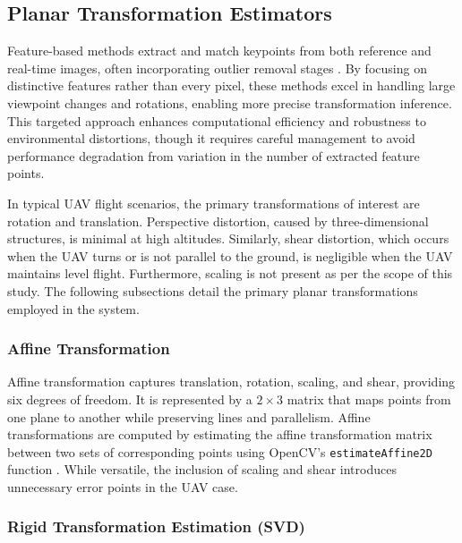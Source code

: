 

\subsection{Planar Transformation Estimators}

Feature-based methods extract and match keypoints from both reference and real-time images, often incorporating outlier removal stages \cite{GlobalLocal2023}. By focusing on distinctive features rather than every pixel, these methods excel in handling large viewpoint changes and rotations, enabling more precise transformation inference. This targeted approach enhances computational efficiency and robustness to environmental distortions, though it requires careful management to avoid performance degradation from variation in the number of extracted feature points. 

In typical UAV flight scenarios, the primary transformations of interest are rotation and translation. Perspective distortion, caused by three-dimensional structures, is minimal at high altitudes. Similarly, shear distortion, which occurs when the UAV turns or is not parallel to the ground, is negligible when the UAV maintains level flight. Furthermore, scaling is not present as per the scope of this study. The following subsections detail the primary planar transformations employed in the system.

\subsubsection{Affine Transformation}

Affine transformation captures translation, rotation, scaling, and shear, providing six degrees of freedom. It is represented by a  \(2 \times 3\) matrix that maps points from one plane to another while preserving lines and parallelism. Affine transformations are computed by estimating the affine transformation matrix between two sets of corresponding points using OpenCV's \texttt{estimateAffine2D} function \cite{opencv_warp_affine}. While versatile, the inclusion of scaling and shear introduces unnecessary error points in the UAV case.

\subsubsection{Rigid Transformation Estimation (SVD)}

